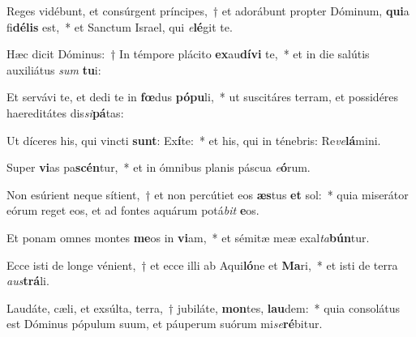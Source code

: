 \item Reges vidébunt, et consúrgent príncipes,~† et adorábunt propter Dóminum, \textbf{qui}a fi\textbf{dé}\textbf{lis} est,~* et Sanctum Israel, qui \textit{e}\textbf{lé}git te.
\item Hæc dicit Dóminus:~† In témpore plácito \textbf{ex}au\textbf{dí}\textbf{vi} te,~* et in die salútis auxiliátus \textit{sum} \textbf{tu}i:
\item Et servávi te, et dedi te in \textbf{fœ}dus \textbf{pó}\textbf{pu}li,~* ut suscitáres terram, et possidéres haereditátes dis\textit{si}\textbf{pá}tas:
\item Ut díceres his, qui vincti \textbf{sunt}: Ex\textbf{í}te:~* et his, qui in ténebris: Re\textit{ve}\textbf{lá}mini.
\item Super \textbf{vi}as pa\textbf{scén}tur,~* et in ómnibus planis páscua \textit{e}\textbf{ó}rum.
\item Non esúrient neque sítient,~† et non percútiet eos \textbf{æs}tus \textbf{et} sol:~* quia miserátor eórum reget eos, et ad fontes aquárum potá\textit{bit} \textbf{e}os.
\item Et ponam omnes montes \textbf{me}os in \textbf{vi}am,~* et sémitæ meæ exal\textit{ta}\textbf{bún}tur.
\item Ecce isti de longe vénient,~† et ecce illi ab Aqui\textbf{ló}ne et \textbf{Ma}ri,~* et isti de terra \textit{aus}\textbf{trá}li.
\item Laudáte, cæli, et exsúlta, terra,~† jubiláte, \textbf{mon}tes, \textbf{lau}dem:~* quia consolátus est Dóminus pópulum suum, et páuperum suórum mi\textit{se}\textbf{ré}bitur.
